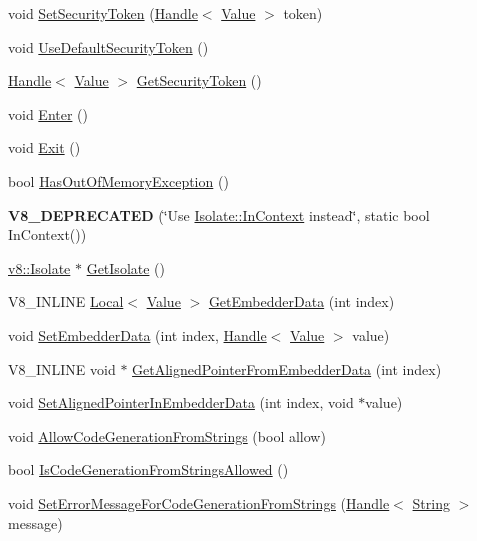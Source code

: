 \begin{DoxyCompactItemize}
\item 
void \hyperlink{classv8_1_1_context_a288d8549547f6bdf4312f5333f60f24d}{Set\+Security\+Token} (\hyperlink{classv8_1_1_handle}{Handle}$<$ \hyperlink{classv8_1_1_value}{Value} $>$ token)
\item 
void \hyperlink{classv8_1_1_context_aa9e1a14982b64fd51ab87600a287bad2}{Use\+Default\+Security\+Token} ()
\item 
\hyperlink{classv8_1_1_handle}{Handle}$<$ \hyperlink{classv8_1_1_value}{Value} $>$ \hyperlink{classv8_1_1_context_a8e71e658633518ca7718c0f6e938c6a9}{Get\+Security\+Token} ()
\item 
void \hyperlink{classv8_1_1_context_a6995c49d9897eb49053f07874b825133}{Enter} ()
\item 
void \hyperlink{classv8_1_1_context_a2db09d4fefb26023a40d88972a4c1599}{Exit} ()
\item 
bool \hyperlink{classv8_1_1_context_aadec400a5da1e79e58a8770fd706b9a0}{Has\+Out\+Of\+Memory\+Exception} ()
\item 
\hypertarget{classv8_1_1_context_aceaa6d67a63557e4e69a556cd1f0909d}{}{\bfseries V8\+\_\+\+D\+E\+P\+R\+E\+C\+A\+T\+E\+D} (\char`\"{}Use \hyperlink{classv8_1_1_isolate_afb6bbd31a87d0999dbbe5402447690a9}{Isolate\+::\+In\+Context} instead\char`\"{}, static bool In\+Context())\label{classv8_1_1_context_aceaa6d67a63557e4e69a556cd1f0909d}

\item 
\hyperlink{classv8_1_1_isolate}{v8\+::\+Isolate} $\ast$ \hyperlink{classv8_1_1_context_af55552d8658ecb20eff7af2c83e8ede2}{Get\+Isolate} ()
\item 
V8\+\_\+\+I\+N\+L\+I\+N\+E \hyperlink{classv8_1_1_local}{Local}$<$ \hyperlink{classv8_1_1_value}{Value} $>$ \hyperlink{classv8_1_1_context_a9cfafe0ac56f6aee17eb80a913489296}{Get\+Embedder\+Data} (int index)
\item 
void \hyperlink{classv8_1_1_context_ae18e007074770872e78e0040f36de8c6}{Set\+Embedder\+Data} (int index, \hyperlink{classv8_1_1_handle}{Handle}$<$ \hyperlink{classv8_1_1_value}{Value} $>$ value)
\item 
V8\+\_\+\+I\+N\+L\+I\+N\+E void $\ast$ \hyperlink{classv8_1_1_context_aa3b5c1a1a5d145c6096840898013f559}{Get\+Aligned\+Pointer\+From\+Embedder\+Data} (int index)
\item 
void \hyperlink{classv8_1_1_context_a522063c88e4c2832f5ff4f3980815f58}{Set\+Aligned\+Pointer\+In\+Embedder\+Data} (int index, void $\ast$value)
\item 
void \hyperlink{classv8_1_1_context_a794ccc42113566f5d363f89c8b0d3c2c}{Allow\+Code\+Generation\+From\+Strings} (bool allow)
\item 
bool \hyperlink{classv8_1_1_context_aa7a960a232d232d1a2a904c2e6c18831}{Is\+Code\+Generation\+From\+Strings\+Allowed} ()
\item 
void \hyperlink{classv8_1_1_context_a6a8d067b246b8792b19e8075bc410f1d}{Set\+Error\+Message\+For\+Code\+Generation\+From\+Strings} (\hyperlink{classv8_1_1_handle}{Handle}$<$ \hyperlink{classv8_1_1_string}{String} $>$ message)
\end{DoxyCompactItemize}
